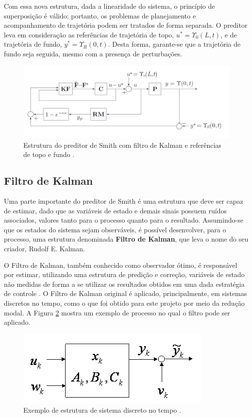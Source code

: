 Com essa nova estrutura, dada a linearidade do sistema, o princípio de superposição é válido; portanto, os problemas de planejamento e acompanhamento de trajetória podem ser tratados de forma separada. O preditor leva em consideração as referências de trajetória de topo, $u^{*} = \Upsilon_0 (L,t)$, e de trajetória de fundo, $y^{*} = \Upsilon_R (0,t)$. Desta forma, garante-se que a trajetória de fundo seja seguida, mesmo com a presença de perturbações.

\begin{figure}[!ht]
\centering
\caption{Estrutura do preditor de Smith com filtro de Kalman e referências de topo e fundo \cite{rafaelMestrado}. \label{smith2}}
\includegraphics[width=.85\linewidth]{figs/fundamentos/preditorSmith}
\end{figure}

\subsection{Filtro de Kalman}
Uma parte importante do preditor de Smith é uma estrutura que deve ser capaz de estimar, dado que as variáveis de estado e demais sinais possuem ruídos associados, valores tanto para o processo quanto para o resultado. Assumindo-se que os estados do sistema sejam observáveis, é possível desenvolver, para o processo, uma estrutura denominada \textbf{Filtro de Kalman}, que leva o nome do seu criador, Rudolf E. Kalman.

O Filtro de Kalman, também conhecido como observador ótimo, é responsável por estimar, utilizando uma estrutura de predição e correção, variáveis de estado não medidas de forma a se utilizar os resultados obtidos em uma dada estratégia de controle \cite{GoddardKalman}. O Filtro de Kalman original é aplicado, principalmente, em sistemas discretos no tempo, como o que foi obtido para este projeto por meio da redução modal. A Figura \ref{Kalman1} mostra um exemplo de processo no qual o filtro pode ser aplicado.
\begin{figure}[!ht]
\centering
\caption{Exemplo de estrutura de sistema discreto no tempo \cite{GoddardKalman}. \label{Kalman1}}
\includegraphics[width=.5\linewidth]{figs/kalman/kalman1}
\end{figure}

